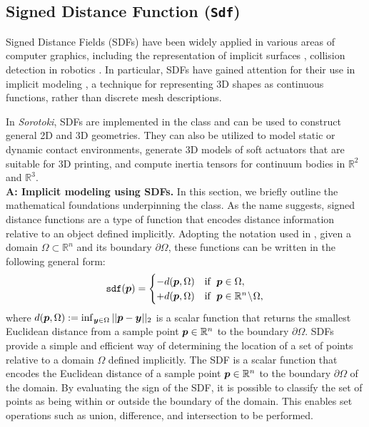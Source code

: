 \subsection{Signed Distance Function (\texttt{Sdf})}
\label{sec:C5:sdf}
Signed Distance Fields (SDFs) have been widely applied in various areas of computer graphics, including the representation of implicit surfaces \cite{Reiner2011Jun, Chen2018Dec}, collision detection in robotics \cite{Ortiz2022Apr, Liu2022Mar}. In particular, SDFs have gained attention for their use in implicit modeling \cite{Smith2023Feb}, a technique for representing 3D shapes as continuous functions, rather than discrete mesh descriptions. 

In \textit{Sorotoki}, SDFs are implemented in the class  and can be used to construct general 2D and 3D geometries. They can also be utilized to model static or dynamic contact environments, generate 3D models of soft actuators that are suitable for 3D printing, and compute inertia tensors for continuum bodies in $\mathbb{R}^2$ and $\mathbb{R}^3$. \\

\textbf{A: Implicit modeling using SDFs.} In this section, we briefly outline the mathematical foundations underpinning the  class. As the name suggests, signed distance functions are a type of function that encodes distance information relative to an object defined implicitly. Adopting the notation used in \cite{Reiner2011Jun}, given a domain $\Omega \subset \mathbb{R}^n$ and its boundary $\partial \Omega$, these functions can be written in the following general form:
%
\begin{equation}
    \texttt{sdf}({\boldsymbol{p}}) = \begin{cases}
        -d({\boldsymbol{p}},\Omega) & \textrm{if } \; {\boldsymbol{p}} \in \Omega,                           \\
        +d({\boldsymbol{p}},\Omega)  & \textrm{if } \; {\boldsymbol{p}} \in \mathbb{R}^n\!\setminus\! \Omega,
    \end{cases}
    \label{eq:C5:sdf}
\end{equation}
%
where $d({\boldsymbol{p}},\Omega):= \inf_{{\boldsymbol{y}} \in \Omega} ||{\boldsymbol{p}} - {\boldsymbol{y}}||_2$ is a scalar function that returns the smallest Euclidean distance from a sample point ${\boldsymbol{p}} \in \mathbb{R}^n$ to the boundary $\partial \Omega$. 
%
SDFs provide a simple and efficient way of determining the location of a set of points relative to a domain $\Omega$ defined implicitly. The SDF is a scalar function that encodes the Euclidean distance of a sample point ${\boldsymbol{p}} \in \mathbb{R}^n$ to the boundary $\partial \Omega$ of the domain. By evaluating the sign of the SDF, it is possible to classify the set of points as being within or outside the boundary of the domain. This enables set operations such as union, difference, and intersection to be performed. 

